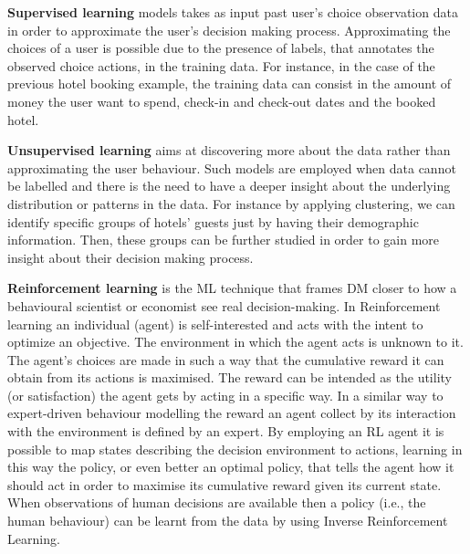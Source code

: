 \noindent\textbf{Supervised learning} \cite{Russell:2009:AIM:1671238} models takes as input past user's choice observation data in order to approximate the user's decision making process. 
Approximating the choices of a user is possible due to the presence of labels, that annotates the observed choice actions, in the training data. For instance, in the case of the previous hotel booking example, the training data can consist in the amount of money the user want to spend, check-in and check-out dates and the booked hotel. \newline

\noindent\textbf{Unsupervised learning} \cite{unsupervised:Hinton1999} aims at discovering more about the data rather than approximating the user behaviour. Such models are employed when data cannot be labelled and there is the need to have a deeper insight about the underlying distribution or patterns in the data. For instance by applying clustering, we can identify specific groups of hotels' guests just by having their demographic information. Then, these groups can be further studied in order to gain more insight about their decision making process. \newline


\noindent\textbf{Reinforcement learning} \cite{sutton:1998} is the ML technique that frames DM closer to how a behavioural scientist or economist see real decision-making. In Reinforcement learning an individual 
(agent) is self-interested and acts with the intent to optimize an objective. 
The environment in which the agent acts is unknown to it. The agent's choices are made in such a way that the cumulative reward it can obtain from its actions is maximised. The reward can be intended as the utility (or satisfaction) the agent gets by acting in a specific way. In a similar way to expert-driven behaviour modelling the reward an agent collect by its interaction with the environment is defined by an expert. By employing an RL agent it is possible to map states describing the decision environment to actions, 
learning in this way the policy, 
or even better an optimal policy, that tells the agent how it should act in order to maximise its cumulative reward given its current state.
When observations of human decisions are available then a policy (i.e., the human behaviour) can be learnt from the data by using Inverse Reinforcement Learning. 

